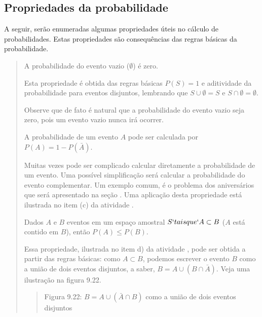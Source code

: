 \subsection{Propriedades da probabilidade}
\label{\detokenize{PE511-4:propriedades-da-probabilidade}}
A seguir, serão enumeradas algumas propriedades úteis no cálculo de probabilidades. Estas propriedades são consequências das regras básicas da probabilidade.
\begin{quote}

 A probabilidade do evento vazio (\(\emptyset\)) é zero.

Esta propriedade é obtida das regras básicas \(P(S)=1\) e aditividade da probabilidade para eventos disjuntos, lembrando que \(S\cup \emptyset =S\) e \(S\cap \emptyset =\emptyset\).

Observe que de fato é natural que a probabilidade do evento vazio seja zero, pois um evento vazio nunca irá ocorrer.

 A probabilidade de um evento \(A\) pode ser calculada por \(P({A})= 1-P(\bar{A})\).

Muitas vezes pode ser complicado calcular diretamente a probabilidade de um evento. Uma possível simplificação será calcular a probabilidade do evento complementar. Um exemplo comum, é o problema dos aniversários que será apresentado na seção {\hyperref[\detokenize{PE511-5:sec-praticando-propriedades}]{}}. Uma aplicação desta propriedade está ilustrada no item (c) da atividade .

 Dados \(A\) e \(B\) eventos em um espaço amostral \(S`tais que `A\subset B\) (\(A\) está contido em \(B\)), então \(P(A)\leq P(B)\).

Essa propriedade, ilustrada no item d) da atividade , pode ser obtida a partir das regras básicas:
como \(A\subset B\), podemos escrever o evento \(B\) como a união de dois eventos disjuntos, a saber,  \(B=A\cup (B\cap \bar{A})\). Veja uma ilustração na figura 9.22.
\begin{quote}
\begin{center}\end{center}
Figura 9.22: \(B=A\cup (\bar{A}\cap B)\) como a união de dois eventos disjuntos
\end{quote}


\end{quote}
